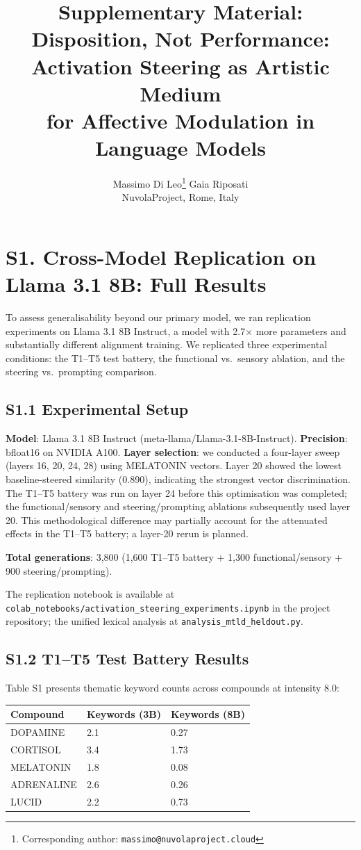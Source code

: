 \documentclass[11pt,a4paper]{article}
\title{Supplementary Material:\\Disposition, Not Performance:\\
Activation Steering as Artistic Medium\\
for Affective Modulation in Language Models}
\author{Massimo Di Leo\thanks{Corresponding author: \texttt{massimo@nuvolaproject.cloud}} \quad Gaia Riposati \\
\small NuvolaProject, Rome, Italy}
\date{}
\begin{document}
\maketitle

\section*{S1. Cross-Model Replication on Llama 3.1 8B: Full Results}

To assess generalisability beyond our primary model, we ran replication experiments on Llama 3.1 8B Instruct, a model with 2.7× more parameters and substantially different alignment training. We replicated three experimental conditions: the T1--T5 test battery, the functional vs.~sensory ablation, and the steering vs.~prompting comparison.

\subsection*{S1.1 Experimental Setup}

\textbf{Model}: Llama 3.1 8B Instruct (meta-llama/Llama-3.1-8B-Instruct). \textbf{Precision}: bfloat16 on NVIDIA A100. \textbf{Layer selection}: we conducted a four-layer sweep (layers 16, 20, 24, 28) using MELATONIN vectors. Layer 20 showed the lowest baseline-steered similarity (0.890), indicating the strongest vector discrimination. The T1--T5 battery was run on layer 24 before this optimisation was completed; the functional/sensory and steering/prompting ablations subsequently used layer 20. This methodological difference may partially account for the attenuated effects in the T1--T5 battery; a layer-20 rerun is planned.

\textbf{Total generations}: 3,800 (1,600 T1--T5 battery + 1,300 functional/sensory + 900 steering/prompting).

The replication notebook is available at \texttt{colab\_notebooks/activation\_steering\_experiments.ipynb} in the project repository; the unified lexical analysis at \texttt{analysis\_mtld\_heldout.py}.

\subsection*{S1.2 T1--T5 Test Battery Results}

Table S1 presents thematic keyword counts across compounds at intensity 8.0:

\begin{longtable}[]{@{}lll@{}}
\toprule\noalign{}
Compound & Keywords (3B) & Keywords (8B) \\
\midrule\noalign{}
\endhead
\bottomrule\noalign{}
\endlastfoot
DOPAMINE & 2.1 & 0.27 \\
CORTISOL & 3.4 & 1.73 \\
MELATONIN & 1.8 & 0.08 \\
ADRENALINE & 2.6 & 0.26 \\
LUCID & 2.2 & 0.73 \\
\end{longtable}
\end{document}
